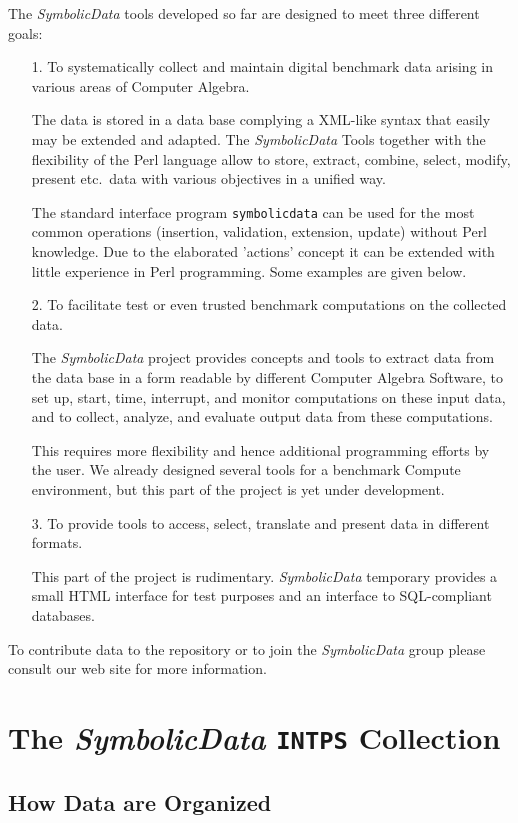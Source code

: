 \documentclass[11pt]{article}
\newcommand{\SD}{{\em Symbo\-lic\-Data}}
\begin{document}
The {\SD} tools developed so far are designed to meet three
different goals:
\begin{itemize}
\item[1.] To systematically collect and maintain digital
benchmark data arising in various areas of Computer Algebra.

The data is stored in a data base complying a XML-like syntax
that easily may be extended and adapted. The {\SD} Tools together
with the flexibility of the Perl language allow to store,
extract, combine, select, modify, present etc.\ data with various
objectives in a unified way.

The standard interface program {\tt symbolicdata} can be used for the
most common operations (insertion, validation, extension, update)
without Perl knowledge.  Due to the elaborated 'actions' concept it
can be extended with little experience in Perl programming.  Some
examples are given below. 

\item[2.] To facilitate test or even trusted benchmark
computations on the collected data.

The {\SD} project provides concepts and tools to extract data from
the data base in a form readable by different Computer Algebra
Software, to set up, start, time, interrupt, and monitor
computations on these input data, and to collect, analyze, and
evaluate output data from these computations.  

This requires more flexibility and hence additional programming
efforts by the user.  We already designed several tools for a
benchmark Compute environment, but this part of the project is yet
under development.

\item[3.] To provide tools to access, select, translate and
present data in different formats.

This part of the project is rudimentary. {\SD} temporary provides a
small HTML interface for test purposes and an interface to
SQL-compliant databases.
\end{itemize}

To contribute data to the repository or to join the {\SD} group
please consult our web site for more information.

\section{The {\SD} {\tt INTPS} Collection}

\subsection{How Data are Organized}
\end{document}
